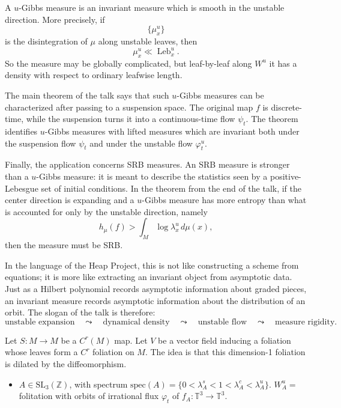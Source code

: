 \begin{remark}[Overview]
\medskip\noindent
A $u$-Gibbs measure is an invariant measure
which is smooth in the unstable direction.
More precisely, if
$$
\{\mu_x^u\}
$$
is the disintegration of $\mu$ along unstable
leaves, then
$$
\mu_x^u\ll \operatorname{Leb}_x^u.
$$
So the measure may be globally complicated,
but leaf-by-leaf along $W^u$ it has a density
with respect to ordinary leafwise length.

\medskip\noindent
The main theorem of the talk says that such
$u$-Gibbs measures can be characterized after
passing to a suspension space. The original
map $f$ is discrete-time, while the suspension
turns it into a continuous-time flow
$\psi_t$. The theorem identifies $u$-Gibbs
measures with lifted measures which are
invariant both under the suspension flow
$\psi_t$ and under the unstable flow
$\varphi_t^u$.

\medskip\noindent
Finally, the application concerns SRB
measures. An SRB measure is stronger than a
$u$-Gibbs measure: it is meant to describe
the statistics seen by a positive-Lebesgue
set of initial conditions. In the theorem
from the end of the talk, if the center
direction is expanding and a $u$-Gibbs measure
has more entropy than what is accounted for
only by the unstable direction, namely
$$
h_\mu(f)>
\int_M \log \lambda_x^u\,d\mu(x),
$$
then the measure must be SRB.

\medskip\noindent
In the language of the Heap Project, this is
not like constructing a scheme from equations;
it is more like extracting an invariant
object from asymptotic data. Just as a Hilbert
polynomial records asymptotic information
about graded pieces, an invariant measure
records asymptotic information about the
distribution of an orbit. The slogan of the
talk is therefore:
$$
\text{unstable expansion}
\quad\leadsto\quad
\text{dynamical density}
\quad\leadsto\quad
\text{unstable flow}
\quad\leadsto\quad
\text{measure rigidity}.
$$
\end{remark}

\noindent
Let $S:M \to M$ be a $C^r(M)$ map.
Let $V$ be a vector field
inducing a foliation
whose leaves form a $C^r$ foliation
on $M$.
The idea is
that this dimension-1 
foliation is dilated by the
diffeomorphism.

\begin{example}
\label{example-sl3-spectrum}
\begin{itemize}
\item $A \in \text{SL}_3(\mathbb{Z})$,
with spectrum
$\text{spec}(A)
= \{0<\lambda_A^s<1<
\lambda^c_A
<\lambda^u_A\}$.
$W_A^u
= $ folitation with orbits
of irrational flux $\varphi_t$
of $f_A:\mathbb{T}^3 \to \mathbb{T}^3$.
\end{itemize}
\end{example}

